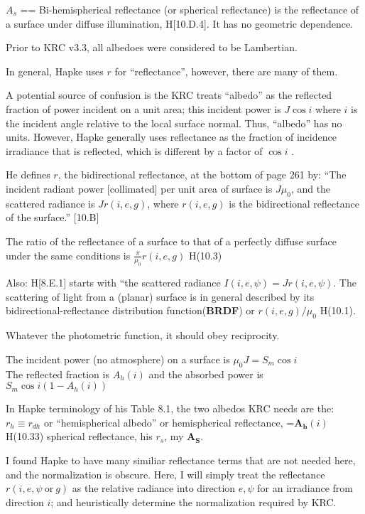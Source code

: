 $A_s$ == Bi-hemispherical reflectance (or spherical reflectance) is the
reflectance of a surface under diffuse illumination, H[10.D.4]. It has no
geometric dependence.

Prior to KRC v3.3, all albedoes were considered to be Lambertian.  



In general, Hapke uses $r$ for ``reflectance'', however, there are many of them.

A potential source of confusion is the KRC treats ``albedo'' as the reflected
fraction of power incident on a unit area; this incident power is $J \cos i$
where $i$ is the incident angle relative to the local surface normal. Thus,
``albedo'' has no units. However, Hapke generally uses reflectance as the
fraction of incidence irradiance that is reflected, which is different by a
factor of $\cos i$ .

He defines $r$, the bidirectional reflectance, at the bottom of page 261 by:
``The incident radiant power [collimated] per unit area of surface is $J \mu_0$,
and the scattered radiance is $Jr(i,e,g)$, where $r(i,e,g)$ is the bidirectional
reflectance of the surface.'' [10.B]

The ratio of the reflectance of a surface to that of a perfectly diffuse surface
under the same conditions is $\frac{\pi}{\mu_0}r(i,e,g)$ H(10.3)

Also: H[8.E.1] starts with ``the scattered radiance $I(i,e,\psi)
=Jr(i,e,\psi)$.
The scattering of light from a (planar) surface is in general described by its
bidirectional-reflectance distribution function(\textbf{BRDF}) or
$r(i,e,g)/\mu_0$ H(10.1).

Whatever the photometric function, it should obey reciprocity.

The incident power (no atmosphere) on a surface is $\mu_0 J = S_m \cos i $
\\ The reflected fraction is $A_h(i)$ and the absorbed power is $S_m \cos i \left(1-A_h(i) \right)$


In Hapke terminology of his Table 8.1, the two albedos KRC needs are the:
\qi  $r_h \equiv r_{dh}$ or ``hemispherical albedo'' or hemispherical reflectance, =$\mathbf{A_h}(i)$ H(10.33) 
\qi spherical reflectance, his $r_s$, my $\mathbf{A_S}$. 

I found Hapke to have many similiar reflectance terms that are not needed 
here, and the normalization is obscure.  Here, I will simply treat the
reflectance $r(i,e,\psi \ \mathrm{or} \ g)$ as the relative radiance into
direction $e,\psi$ for an irradiance from direction $i$; and heuristically
determine the normalization required by KRC.

